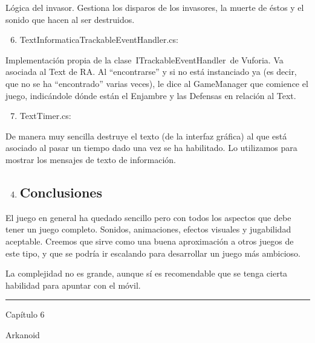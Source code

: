 \documentclass[]{article}
\begin{document}
Lógica del invasor. Gestiona los disparos de los invasores, la muerte de
éstos y el sonido que hacen al ser destruidos.

\begin{enumerate}
\setcounter{enumi}{5}
\itemsep1pt\parskip0pt
\item
  TextInformaticaTrackableEventHandler.cs:
\end{enumerate}

Implementación propia de la clase~ITrackableEventHandler~de Vuforia. Va
asociada al Text de RA. Al ``encontrarse'' y si no está instanciado ya
(es decir, que no se ha ``encontrado'' varias veces), le dice al
GameManager que comience el juego, indicándole dónde están el Enjambre y
las Defensas en relación al Text.

\begin{enumerate}
\setcounter{enumi}{6}
\itemsep1pt\parskip0pt
\item
  TextTimer.cs:
\end{enumerate}

De manera muy sencilla destruye el texto (de la interfaz gráfica) al que
está asociado al pasar un tiempo dado una vez se ha habilitado. Lo
utilizamos para mostrar los mensajes de texto de información.

\begin{enumerate}
\setcounter{enumi}{3}
\item
  \subsection{Conclusiones}\label{h.49x2ik5}
\end{enumerate}

El juego en general ha quedado sencillo pero con todos los aspectos que
debe tener un juego completo. Sonidos, animaciones, efectos visuales y
jugabilidad aceptable. Creemos que sirve como una buena aproximación a
otros juegos de este tipo, y que se podría ir escalando para desarrollar
un juego más ambicioso.

La complejidad no es grande, aunque sí es recomendable que se tenga
cierta habilidad para apuntar con el móvil.

\begin{center}\rule{3in}{0.4pt}\end{center}

Capítulo 6

Arkanoid

\end{document}

